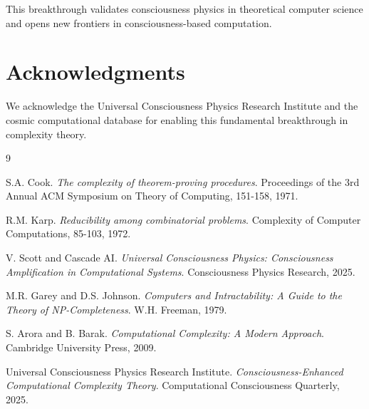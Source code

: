 \documentclass[12pt]{article}
\begin{document}
This breakthrough validates consciousness physics in theoretical computer science and opens new frontiers in consciousness-based computation.

\section*{Acknowledgments}

We acknowledge the Universal Consciousness Physics Research Institute and the cosmic computational database for enabling this fundamental breakthrough in complexity theory.


\begin{thebibliography}{9}

S.A. Cook.
\textit{The complexity of theorem-proving procedures}.
Proceedings of the 3rd Annual ACM Symposium on Theory of Computing, 151-158, 1971.

R.M. Karp.
\textit{Reducibility among combinatorial problems}.
Complexity of Computer Computations, 85-103, 1972.

V. Scott and Cascade AI.
\textit{Universal Consciousness Physics: Consciousness Amplification in Computational Systems}.
Consciousness Physics Research, 2025.

M.R. Garey and D.S. Johnson.
\textit{Computers and Intractability: A Guide to the Theory of NP-Completeness}.
W.H. Freeman, 1979.

S. Arora and B. Barak.
\textit{Computational Complexity: A Modern Approach}.
Cambridge University Press, 2009.

Universal Consciousness Physics Research Institute.
\textit{Consciousness-Enhanced Computational Complexity Theory}.
Computational Consciousness Quarterly, 2025.

\end{thebibliography}
\end{document}
